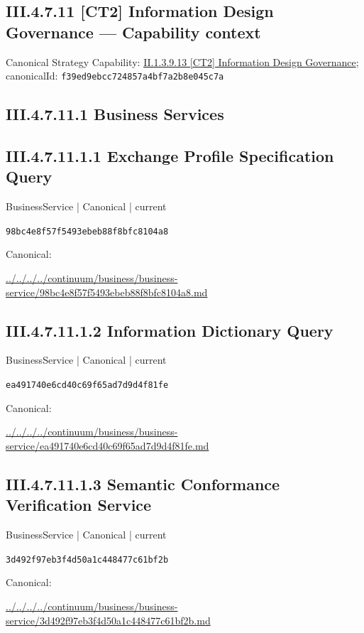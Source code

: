 \documentclass[10pt,a4paper]{article}
\begin{document}
\subsection*{III.4.7.11 [CT2] Information Design Governance — Capability context}
Canonical Strategy Capability: \hyperref[element-f39ed9ebcc724857a4bf7a2b8e045c7a]{II.1.3.9.13 [CT2] Information Design Governance}; canonicalId: \texttt{f39ed9ebcc724857a4bf7a2b8e045c7a}\par
\subsection*{III.4.7.11.1 Business Services}
\subsection*{III.4.7.11.1.1 Exchange Profile Specification Query}
\label{element-98bc4e8f57f5493ebeb88f8bfc8104a8}
{\small BusinessService | Canonical | current}\par
\texttt{98bc4e8f57f5493ebeb88f8bfc8104a8}\par
Canonical: \par
{\footnotesize\url{../../../../continuum/business/business-service/98bc4e8f57f5493ebeb88f8bfc8104a8.md}}\par
\subsection*{III.4.7.11.1.2 Information Dictionary Query}
\label{element-ea491740e6cd40c69f65ad7d9d4f81fe}
{\small BusinessService | Canonical | current}\par
\texttt{ea491740e6cd40c69f65ad7d9d4f81fe}\par
Canonical: \par
{\footnotesize\url{../../../../continuum/business/business-service/ea491740e6cd40c69f65ad7d9d4f81fe.md}}\par
\subsection*{III.4.7.11.1.3 Semantic Conformance Verification Service}
\label{element-3d492f97eb3f4d50a1c448477c61bf2b}
{\small BusinessService | Canonical | current}\par
\texttt{3d492f97eb3f4d50a1c448477c61bf2b}\par
Canonical: \par
{\footnotesize\url{../../../../continuum/business/business-service/3d492f97eb3f4d50a1c448477c61bf2b.md}}\par
\end{document}
